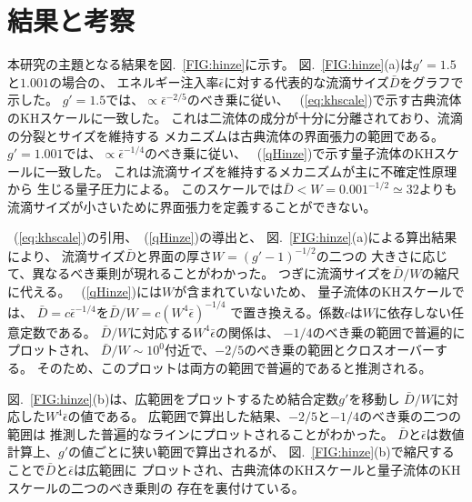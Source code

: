 \documentclass[12pt,a4paper]{jbook}
\begin{document}
		\section{結果と考察}
        本研究の主題となる結果を図.~\ref{FIG:hinze}に示す。
        図.~\ref{FIG:hinze}(a)は$g'=1.5$と$1.001$の場合の、
        エネルギー注入率$\bar\epsilon$に対する代表的な流滴サイズ$\bar D$をグラフで示した。
        $g'=1.5$では、$\propto \bar\epsilon^{-2/5}$のべき乗に従い、
        ~(\ref{eq:khscale})で示す古典流体のKHスケールに一致した。
        これは二流体の成分が十分に分離されており、流滴の分裂とサイズを維持する
        メカニズムは古典流体の界面張力の範囲である。
        $g'=1.001$では、$\propto \bar\epsilon^{-1/4}$のべき乗に従い、
        ~(\ref{qHinze})で示す量子流体のKHスケールに一致した。
        これは流滴サイズを維持するメカニズムが主に不確定性原理から
        生じる量子圧力による。
        このスケールでは$\bar D < W = 0.001^{-1/2} \simeq 32$よりも
        流滴サイズが小さいために界面張力を定義することができない。
        
        ~(\ref{eq:khscale})の引用、~(\ref{qHinze})の導出と、
        図.~\ref{FIG:hinze}(a)による算出結果により、
        流滴サイズ$\bar D$と界面の厚さ$W = (g' - 1)^{-1/2}$の二つの
        大きさに応じて、異なるべき乗則が現れることがわかった。
        つぎに流滴サイズを$\bar D / W$の縮尺に代える。
        ~(\ref{qHinze})には$W$が含まれていないため、
        量子流体のKHスケールでは、
        $\bar D = c \bar\epsilon^{-1/4}$を$\bar D / W = c (W^4 \bar\epsilon)^{-1/4}$
        で置き換える。係数$c$は$W$に依存しない任意定数である。
        $\bar D / W$に対応する$W^4 \bar\epsilon$の関係は、
        $-1/4$のべき乗の範囲で普遍的にプロットされ、
        $\bar D / W \sim 10^0$付近で、$-2/5$のべき乗の範囲とクロスオーバーする。
        そのため、このプロットは両方の範囲で普遍的であると推測される。


        図.~\ref{FIG:hinze}(b)は、広範囲をプロットするため結合定数$g'$を移動し
        $\bar D / W$に対応した$W^4 \bar\epsilon$の値である。
        広範囲で算出した結果、$-2/5$と$-1/4$のべき乗の二つの範囲は
        推測した普遍的なラインにプロットされることがわかった。
        $\bar D$と$\bar \epsilon$は数値計算上、$g'$の値ごとに狭い範囲で算出されるが、
        図.~\ref{FIG:hinze}(b)で縮尺することで$\bar D$と$\bar \epsilon$は広範囲に
        プロットされ、古典流体のKHスケールと量子流体のKHスケールの二つのべき乗則の
        存在を裏付けている。
\end{document}
